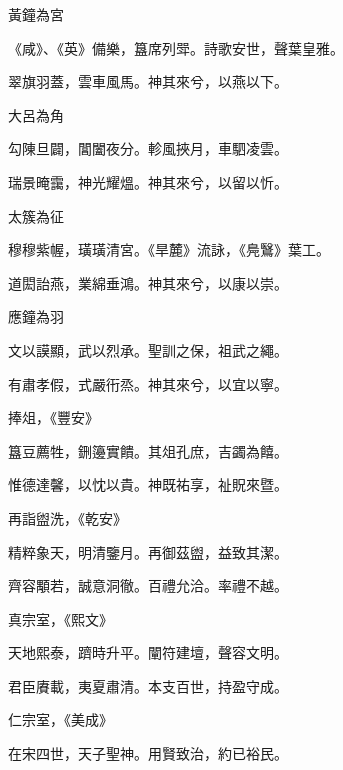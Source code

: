 \begin{pinyinscope}
 黃鐘為宮



 《咸》、《英》備樂，簋席列斝。詩歌安世，聲葉皇雅。



 翠旗羽蓋，雲車風馬。神其來兮，以燕以下。



 大呂為角



 勾陳旦闢，閶闔夜分。軫風挾月，車駟凌雲。



 瑞景晻靄，神光耀熅。神其來兮，以留以忻。



 太簇為征



 穆穆紫幄，璜璜清宮。《旱麓》流詠，《鳧鷖》葉工。



 道閎詒燕，業綿垂鴻。神其來兮，以康以崇。



 應鐘為羽



 文以謨顯，武以烈承。聖訓之保，祖武之繩。



 有肅孝假，式嚴衎烝。神其來兮，以宜以寧。



 捧俎，《豐安》



 簋豆薦牲，鉶籩實饋。其俎孔庶，吉蠲為饎。



 惟德達馨，以忱以貴。神既祐享，祉貺來暨。



 再詣盥洗，《乾安》



 精粹象天，明清鑒月。再御茲盥，益致其潔。



 齊容顒若，誠意洞徹。百禮允洽。率禮不越。



 真宗室，《熙文》



 天地熙泰，躋時升平。闡符建壇，聲容文明。



 君臣賡載，夷夏肅清。本支百世，持盈守成。



 仁宗室，《美成》



 在宋四世，天子聖神。用賢致治，約已裕民。




\end{pinyinscope}
